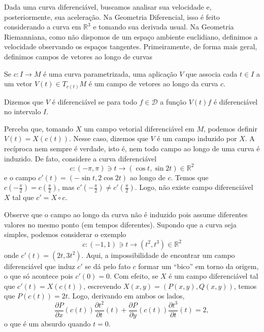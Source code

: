 Dada uma curva diferenciável, buscamos analisar sua velocidade e, posteriormente, sua aceleração. Na Geometria Diferencial, isso é feito considerando a curva em $\mathbb{R}^{3}$ e tomando sua derivada usual. Na Geometria Riemanniana, como não dispomos de um espaço ambiente euclidiano, definimos a velocidade observando os espaços tangentes. Primeiramente, de forma mais geral, definimos campos de vetores ao longo de curvas
\begin{definition}
	\label{def:campo-ao-longo-de-curva}
	Se $c:I\to M$ é uma curva parametrizada, uma aplicação $V$ que associa cada $t \in I$ a um vetor $V(t) \in T_{c(t)}M$ é um campo de vetores ao longo da curva $c$.

	Dizemos que $V$ é diferenciável se para todo $f \in \mathcal{D}$ a função $V(t)f$ é diferenciável no intervalo $I$.
\end{definition}
Perceba que, tomando $X$ um campo vetorial diferenciável em $M$, podemos definir $V(t)=X(c(t))$. Nesse caso, dizemos que $V$ é um campo induzido por $X$. A recíproca nem sempre é verdade, isto é, nem todo campo ao longo de uma curva é induzido. De fato, considere a curva diferenciável
\begin{equation*}
	c:(-\pi,\pi) \ni t \to (\cos t,\sin2t)\in \mathbb{R}^{2}
\end{equation*}
e o campo $c'(t)=(-\sin t, 2\cos2t)$ ao longo de $c$.
Temos que $c\left( -\frac{\pi}{2} \right)=c\left( \frac{\pi}{2} \right)$, mas $c'\left(-\frac{\pi}{2} \right)\neq c'\left( \frac{\pi}{2} \right)$. Logo, não existe campo diferenciável $X$ tal que $c'=X\circ c$.

Observe que o campo ao longo da curva não é induzido pois assume diferentes valores no mesmo ponto (em tempos diferentes). Supondo que a curva seja simples, podemos considerar o exemplo
\begin{equation*}
	c:(-1, 1) \ni t \to (t^{2},t^{3}) \in \mathbb{R}^{2}
\end{equation*}
onde $c'(t)=(2t, 3t^{2})$.
Aqui, a impossibilidade de encontrar um campo diferenciável que induz $c'$ se dá pelo fato $c$ formar um ``bico'' em torno da origem, o que só acontece pois $c'(0)=0$. Com efeito, se $X$ é um campo diferenciável tal que $c'(t)=X(c(t))$, escrevendo $X(x,y)=(P(x,y),Q(x,y))$, temos que $P(c(t))=2t$. Logo, derivando em ambos os lados,
\begin{equation*}
	\frac{\partial P}{\partial x}(c(t))\frac{\partial t^{2}}{\partial t}(t) + \frac{\partial P}{\partial y}(c(t))\frac{\partial t^{3}}{\partial t}(t)=2,
\end{equation*}
o que é um absurdo quando $t=0$.


